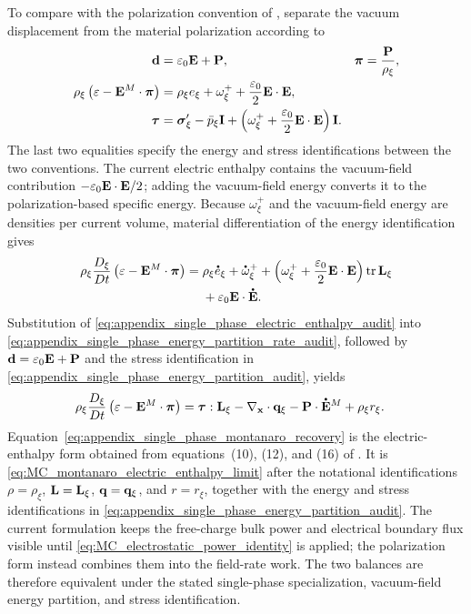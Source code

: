 To compare with the polarization convention of
\cite{montanaro2015thermo_electroelasticity}, separate the vacuum displacement
from the material polarization according to
%
\begin{equation}
\begin{aligned}
\mathbf{d}
&=
\varepsilon_0\mathbf{E}+\mathbf{P},
&
\boldsymbol{\pi}
&=
\frac{\mathbf{P}}{\rho_\xi},
\\
\rho_\xi
\left(
\varepsilon-\mathbf{E}^{M}\cdot\boldsymbol{\pi}
\right)
&=
\rho_\xi e_\xi+\omega_\xi^+
+\frac{\varepsilon_0}{2}\mathbf{E}\cdot\mathbf{E},
\\
\boldsymbol{\tau}
&=
\boldsymbol{\sigma}_\xi'-\bar p_\xi\mathbf{I}
+
\left(
\omega_\xi^+
+\frac{\varepsilon_0}{2}\mathbf{E}\cdot\mathbf{E}
\right)\mathbf{I}.
\end{aligned}
\label{eq:appendix_single_phase_energy_partition_audit}
\end{equation}
%
The last two equalities specify the energy and stress identifications between
the two conventions.  The current electric enthalpy contains the vacuum-field
contribution \(-\varepsilon_0\mathbf{E}\cdot\mathbf{E}/2\); adding the vacuum-field
energy converts it to the polarization-based specific energy.  Because
\(\omega_\xi^+\) and the vacuum-field energy are densities per current volume,
material differentiation of the energy identification gives
%
\begin{align}
\rho_\xi
\frac{D_\xi}{Dt}
\left(
\varepsilon-\mbf E^{M}\cdot\bs\pi
\right)
={}&
\rho_\xi\phasedot e_\xi
+\phasedot\omega_\xi^+
+
\left(
\omega_\xi^+
+\frac{\varepsilon_0}{2}\mbf E\cdot\mbf E
\right)
\operatorname{tr}\mbf L_\xi
\notag\\
&+
\varepsilon_0\mbf E\cdot\phasedot{\mbf E}.
\label{eq:appendix_single_phase_energy_partition_rate_audit}
\end{align}
%
Substitution of
\eqref{eq:appendix_single_phase_electric_enthalpy_audit} into
\eqref{eq:appendix_single_phase_energy_partition_rate_audit}, followed by
\(\mathbf{d}=\varepsilon_0\mathbf{E}+\mathbf{P}\) and the stress identification in
\eqref{eq:appendix_single_phase_energy_partition_audit}, yields
%
\begin{align}
\rho_\xi
\frac{D_\xi}{Dt}
\left(
\varepsilon-\mbf E^{M}\cdot\bs\pi
\right)
&=
\bs\tau:\mbf L_\xi
-\nabla_{\mbf x}\cdot\mbf q_\xi
-\mbf P\cdot\phasedot{\mbf E}^{M}
+\rho_\xi r_\xi.
\label{eq:appendix_single_phase_montanaro_recovery}
\end{align}
%
Equation~\eqref{eq:appendix_single_phase_montanaro_recovery} is the
electric-enthalpy form obtained from equations~(10), (12), and (16) of
\cite{montanaro2015thermo_electroelasticity}.  It is
\eqref{eq:MC_montanaro_electric_enthalpy_limit} after the notational
identifications \(\rho=\rho_\xi\), \(\mathbf{L}=\mathbf{L}_\xi\),
\(\mathbf{q}=\mathbf{q}_\xi\), and \(r=r_\xi\), together with the energy and stress
identifications in \eqref{eq:appendix_single_phase_energy_partition_audit}.
The current formulation keeps
the free-charge bulk power and electrical boundary flux visible until
\eqref{eq:MC_electrostatic_power_identity} is applied; the polarization
form instead combines them into the field-rate work.  The two balances are
therefore equivalent under the stated single-phase specialization, vacuum-field
energy partition, and stress identification.
